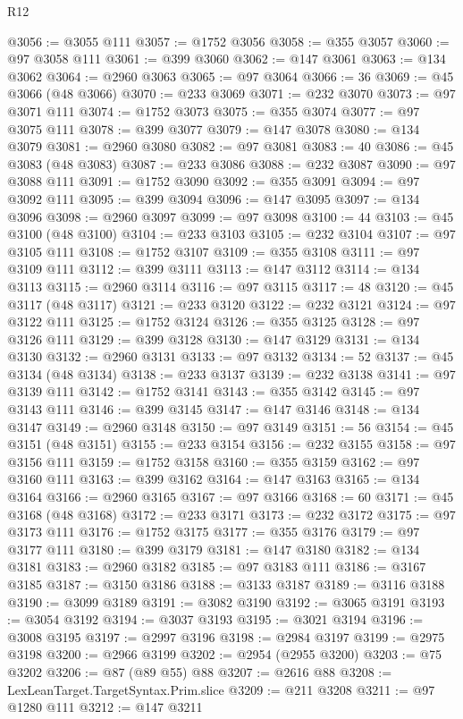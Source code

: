 \begin{lexlean}{R12}
\begin{coremodule}
{{{{{{{{{{{{{{{{{{{{{{{{{{{{{{{{{{{{{{{{{{{{{{{{{{{{{{{{{{{{{{{{{{{{{{{{{{{{{{{{{{@3056 := @3055 @111
@3057 := @1752 @3056
@3058 := @355 @3057
@3060 := @97 @3058 @111
@3061 := @399 @3060
@3062 := @147 @3061
@3063 := @134 @3062
@3064 := @2960 @3063
@3065 := @97 @3064
@3066 := 36
@3069 := @45 @3066 (@48 @3066)
@3070 := @233 @3069
@3071 := @232 @3070
@3073 := @97 @3071 @111
@3074 := @1752 @3073
@3075 := @355 @3074
@3077 := @97 @3075 @111
@3078 := @399 @3077
@3079 := @147 @3078
@3080 := @134 @3079
@3081 := @2960 @3080
@3082 := @97 @3081
@3083 := 40
@3086 := @45 @3083 (@48 @3083)
@3087 := @233 @3086
@3088 := @232 @3087
@3090 := @97 @3088 @111
@3091 := @1752 @3090
@3092 := @355 @3091
@3094 := @97 @3092 @111
@3095 := @399 @3094
@3096 := @147 @3095
@3097 := @134 @3096
@3098 := @2960 @3097
@3099 := @97 @3098
@3100 := 44
@3103 := @45 @3100 (@48 @3100)
@3104 := @233 @3103
@3105 := @232 @3104
@3107 := @97 @3105 @111
@3108 := @1752 @3107
@3109 := @355 @3108
@3111 := @97 @3109 @111
@3112 := @399 @3111
@3113 := @147 @3112
@3114 := @134 @3113
@3115 := @2960 @3114
@3116 := @97 @3115
@3117 := 48
@3120 := @45 @3117 (@48 @3117)
@3121 := @233 @3120
@3122 := @232 @3121
@3124 := @97 @3122 @111
@3125 := @1752 @3124
@3126 := @355 @3125
@3128 := @97 @3126 @111
@3129 := @399 @3128
@3130 := @147 @3129
@3131 := @134 @3130
@3132 := @2960 @3131
@3133 := @97 @3132
@3134 := 52
@3137 := @45 @3134 (@48 @3134)
@3138 := @233 @3137
@3139 := @232 @3138
@3141 := @97 @3139 @111
@3142 := @1752 @3141
@3143 := @355 @3142
@3145 := @97 @3143 @111
@3146 := @399 @3145
@3147 := @147 @3146
@3148 := @134 @3147
@3149 := @2960 @3148
@3150 := @97 @3149
@3151 := 56
@3154 := @45 @3151 (@48 @3151)
@3155 := @233 @3154
@3156 := @232 @3155
@3158 := @97 @3156 @111
@3159 := @1752 @3158
@3160 := @355 @3159
@3162 := @97 @3160 @111
@3163 := @399 @3162
@3164 := @147 @3163
@3165 := @134 @3164
@3166 := @2960 @3165
@3167 := @97 @3166
@3168 := 60
@3171 := @45 @3168 (@48 @3168)
@3172 := @233 @3171
@3173 := @232 @3172
@3175 := @97 @3173 @111
@3176 := @1752 @3175
@3177 := @355 @3176
@3179 := @97 @3177 @111
@3180 := @399 @3179
@3181 := @147 @3180
@3182 := @134 @3181
@3183 := @2960 @3182
@3185 := @97 @3183 @111
@3186 := @3167 @3185
@3187 := @3150 @3186
@3188 := @3133 @3187
@3189 := @3116 @3188
@3190 := @3099 @3189
@3191 := @3082 @3190
@3192 := @3065 @3191
@3193 := @3054 @3192
@3194 := @3037 @3193
@3195 := @3021 @3194
@3196 := @3008 @3195
@3197 := @2997 @3196
@3198 := @2984 @3197
@3199 := @2975 @3198
@3200 := @2966 @3199
@3202 := @2954 (@2955 @3200)
@3203 := @75 @3202
@3206 := @87 (@89 @55) @88
@3207 := @2616 @88
@3208 := LexLeanTarget.TargetSyntax.Prim.slice
@3209 := @211 @3208
@3211 := @97 @1280 @111
@3212 := @147 @3211
}}}}}}}}}}}}}}}}}}}}}}}}}}}}}}}}}}}}}}}}}}}}}}}}}}}}}}}}}}}}}}}}}}}}}}}}}}}}}}}}}}
\end{coremodule}
\end{lexlean}
